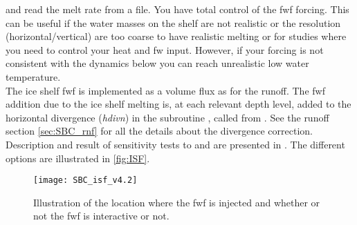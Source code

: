 \documentclass[../main/NEMO_manual]{subfiles}
\begin{document}
 and  read the melt rate from a file.
You have total control of the fwf forcing.
This can be useful if the water masses on the shelf are not realistic or
the resolution (horizontal/vertical) are too coarse to have realistic melting or
for studies where you need to control your heat and fw input. 
However, if your forcing is not consistent with the dynamics below you can reach unrealistic low water temperature.\\

The ice shelf fwf is implemented as a volume flux as for the runoff.
The fwf addition due to the ice shelf melting is, at each relevant depth level, added to
the horizontal divergence (\textit{hdivn}) in the subroutine , called from .
See the runoff section \autoref{sec:SBC_rnf} for all the details about the divergence correction.\\

Description and result of sensitivity tests to  and  are presented in \citet{mathiot.jenkins.ea_GMD17}. 
The different options are illustrated in \autoref{fig:ISF}.

\begin{figure}[!t]
  \centering
  \texttt{[image: SBC\_isf\_v4.2]}
  \caption[Ice shelf location and fresh water flux definition]{
    Illustration of the location where the fwf is injected and
    whether or not the fwf is interactive or not.}
  \label{fig:ISF}
\end{figure}
\end{document}
